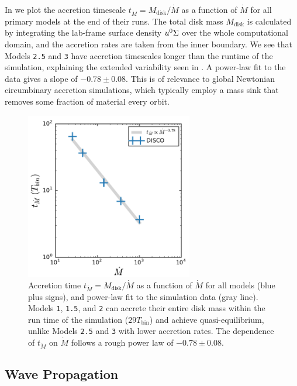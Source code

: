 In  we plot the accretion timescale $t_{\dot{M}} = M_\text{disk} / \dot{M}$ as a function of $\dot{M}$ for all primary models at the end of their runs.  The total disk mass $M_\text{disk}$ is calculated by integrating the lab-frame surface density $u^0 \Sigma$ over the whole computational domain, and the accretion rates are taken from the inner boundary.  We see that Models \texttt{2.5} and \texttt{3} have accretion timescales longer than the runtime of the simulation, explaining the extended variability seen in .  A power-law fit to the data gives a slope of $-0.78 \pm 0.08$. This is of relevance to global Newtonian circumbinary accretion simulations, which typically employ a mass sink that removes some fraction of material every orbit.

\begin{figure}
\begin{center}
\includegraphics[width=0.65\textwidth]{figures/minidisk/tacc.pdf}
\end{center}
\caption{ Accretion time $t_{\dot{M}}=M_\text{disk}/\dot{M}$ as a function of $\dot{M}$ for all models (blue plus signs), and power-law fit to the simulation data (gray line).  Models \texttt{1}, \texttt{1.5}, and \texttt{2} can accrete their entire disk mass within the run time of the simulation ($29 T_\text{bin}$) and achieve quasi-equilibrium, unlike Models \texttt{2.5} and \texttt{3} with lower accretion rates. The dependence of $t_{\dot{M}}$ on $\dot{M}$ follows a rough power law of $-0.78 \pm 0.08$.}
\end{figure}

\subsection{Wave Propagation}

